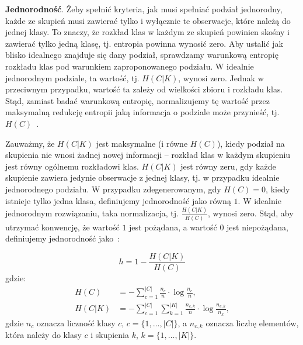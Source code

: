 \documentclass{praca1}
\begin{document}
\textbf{Jednorodność}. Żeby spełnić kryteria, jak musi spełniać podział jednorodny, każde ze skupień musi zawierać tylko i wyłącznie te obserwacje, które należą do jednej klasy. To znaczy, że rozkład klas w każdym ze skupień powinien skośny i zawierać tylko jedną klasę, tj. entropia powinna wynosić zero. Aby ustalić jak blisko idealnego znajduje się dany podział, sprawdzamy warunkową entropię rozkładu klas pod warunkiem zaproponowanego podziału. W idealnie jednorodnym podziale, ta wartość, tj. $H(C|K)$, wynosi zero. Jednak w przeciwnym przypadku, wartość ta zależy od wielkości zbioru i rozkładu klas. Stąd, zamiast badać warunkową entropię, normalizujemy tę wartość przez maksymalną redukcję entropii jaką informacja o podziale może przynieść, tj. $H(C)$~\cite{Rosenberg2007:vmeasure}.

Zauważmy, że $H(C|K)$ jest maksymalne (i równe $H(C)$), kiedy podział na skupienia nie wnosi żadnej nowej informacji -- rozkład klas w każdym skupieniu jest równy ogólnemu rozkładowi klas. $H(C|K)$ jest równy zeru, gdy każde skupienie zawiera jedynie obserwacje z jednej klasy, tj. w przypadku idealnie jednorodnego podziału. W przypadku zdegenerowanym, gdy $H(C) = 0$, kiedy istnieje tylko jedna klasa, definiujemy jednorodność jako równą $1$. W idealnie jednorodnym rozwiązaniu, taka normalizacja, tj. $\frac{H(C|K)}{H(C)}$, wynosi zero. Stąd, aby utrzymać konwencję, że wartość $1$ jest pożądana, a wartość $0$ jest niepożądana, definiujemy jednorodność jako~\cite{Rosenberg2007:vmeasure}:

\begin{equation}
h = %
1 - \frac{H(C|K)}{H(C)} %
\end{equation}
gdzie:
\begin{align*}
H(C) & = - \sum\limits_{c = 1}^{|C|}\frac{n_c}{n}\cdot \log{\frac{n_c}{n}},  \\
H(C|K) & = - \sum\limits_{c = 1}^{|C|}\sum\limits_{k = 1}^{|K|}\frac{n_{c,k}}{n}\cdot \log{\frac{n_{c,k}}{n_k}},
\end{align*}
gdzie $n_c$ oznacza liczność klasy $c$, $c = \{1,\ldots, |C|\}$, a $n_{c,k}$ oznacza liczbę elementów, która należy do klasy $c$ i skupienia $k$, $k = \{1,\ldots, |K|\}$.
\end{document}
